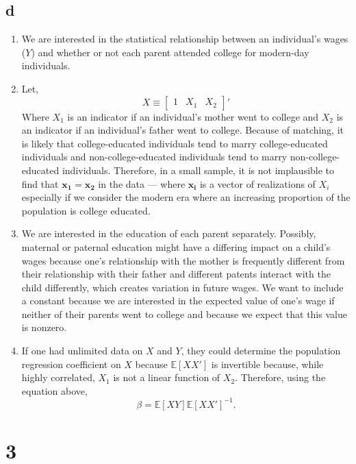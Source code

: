 \documentclass[12pt,notitlepage]{article}
\newcommand{\E}{\mathbb{E}}
\begin{document}
\subsection*{d}
\begin{enumerate}
    \item We are interested in the statistical relationship between an individual's wages ($Y$) and whether or not each parent attended college for modern-day individuals. 
    \item Let,
    \begin{equation*}
        X \equiv 
        \begin{bmatrix}
        1 & X_1 & X_2 
        \end{bmatrix}'
    \end{equation*}
    Where $X_1$ is an indicator if an individual's mother went to college and $X_2$ is an indicator if an individual's father went to college. Because of matching, it is likely that college-educated individuals tend to marry college-educated individuals and non-college-educated individuals tend to marry non-college-educated individuals. Therefore, in a small sample, it is not implausible to find that $\bm{x_1} = \bm{x_2}$ in the data — where $\bm{x_i}$ is a vector of realizations of $X_i$ especially if we consider the modern era where an increasing proportion of the population is college educated.
    \item We are interested in the education of each parent separately. Possibly, maternal or paternal education might have a differing impact on a child's wages because one's relationship with the mother is frequently different from their relationship with their father and different patents  interact with the child differently, which creates variation in future wages. 
    We want to include a constant because we are interested in the expected value of one's wage if neither of their parents went to college and because we expect that this value is nonzero. 
    \item If one had unlimited data on $X$ and $Y$, they could determine the population regression coefficient on $X$ because $\E[XX']$ is invertible because, while highly correlated, $X_1$ is not a linear function of $X_2$. Therefore, using the equation above, 
    \begin{equation*}
        \beta = \E[XY]\E[XX']^{-1}.
    \end{equation*}
\end{enumerate}

\section*{3}
\end{document}
